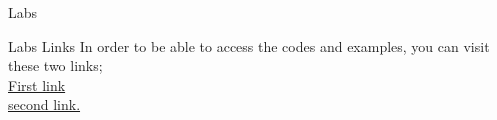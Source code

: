 \documentclass{beamer}\usepackage[]{graphicx}\usepackage[]{xcolor}
\begin{document}
\begin{frame}{Labs}
    \begin{alertblock}{Labs Links}
        In order to be able to access the codes and examples, you can visit these two links;\\
        \href{https://github.com/stats9/R_Fancy/blob/master/WorkShopSums/Beemer_Present/WorkShopSums_code_template.ipynb}{First link}\\
        \href{https://github.com/stats9/R_Fancy/blob/master/WorkShopSums/WorkShop_1_Sums_R_Programming.md}{second link.}
    \end{alertblock}

\end{frame}
\end{document}
